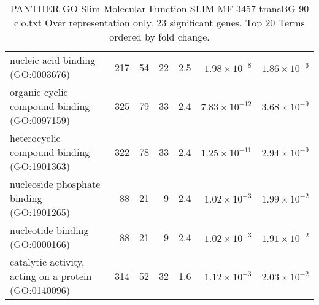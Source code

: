 \begin{table}[ht]
\begin{adjustbox}{width=\textwidth}
\begin{tabular}{lrrrrrr}
  nucleic acid binding (GO:0003676) & 217 & 54 & 22 & 2.5 & $1.98 \times 10^{-8}$ & $1.86 \times 10^{-6}$ \\ 
  organic cyclic compound binding (GO:0097159) & 325 & 79 & 33 & 2.4 & $7.83 \times 10^{-12}$ & $3.68 \times 10^{-9}$ \\ 
  heterocyclic compound binding (GO:1901363) & 322 & 78 & 33 & 2.4 & $1.25 \times 10^{-11}$ & $2.94 \times 10^{-9}$ \\ 
  nucleoside phosphate binding (GO:1901265) & 88 & 21 & 9 & 2.4 & $1.02 \times 10^{-3}$ & $1.99 \times 10^{-2}$ \\ 
  nucleotide binding (GO:0000166) & 88 & 21 & 9 & 2.4 & $1.02 \times 10^{-3}$ & $1.91 \times 10^{-2}$ \\ 
  catalytic activity, acting on a protein (GO:0140096) & 314 & 52 & 32 & 1.6 & $1.12 \times 10^{-3}$ & $2.03 \times 10^{-2}$ \\ 
   \hline
\end{tabular}
\end{adjustbox}
\caption{PANTHER GO-Slim Molecular Function SLIM MF 3457 transBG 90 clo.txt Over representation only. 23 significant genes. Top 20 Terms ordered by fold change. } 
\label{tab:PANTHER GO-Slim Molecular Function SLIM MF 3457 transBG 90 clo.txt Over representation only. 23 significant genes. Top 20 Terms ordered by fold change. }
\end{table}


